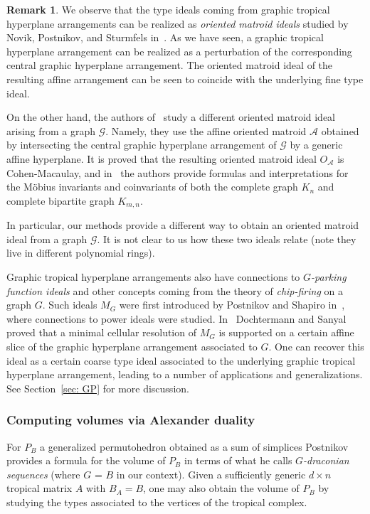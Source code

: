 \documentclass[11pt]{article}
\theoremstyle{definition}
\newtheorem{remark}[theo]{Remark}
\numberwithin{equation}{section}
\newcommand{\cG}{\mathcal{G}}
\begin{document}
\begin{remark}
We observe that the type ideals coming from graphic tropical hyperplane arrangements can be realized as \emph{oriented matroid ideals} studied by Novik, Postnikov, and Sturmfels in~\cite{NPS}.
As we have seen, a graphic tropical hyperplane arrangement can be realized as a perturbation of the corresponding central graphic hyperplane arrangement.  The oriented matroid ideal of the resulting affine arrangement can be seen to coincide with the underlying fine type ideal. 

On the other hand, the authors of~\cite{NPS} study a different oriented matroid ideal arising from a graph $\cG$.  Namely, they use the affine oriented matroid ${\mathcal A}$ obtained by intersecting the central graphic hyperplane arrangement of $\cG$ by a generic affine hyperplane.  It is proved that the resulting oriented matroid ideal $O_{\mathcal A}$ is  Cohen-Macaulay, and in~\cite{NPS} the authors provide formulas and interpretations for the M\"obius invariants and coinvariants of both the complete graph $K_n$ and complete bipartite graph $K_{m,n}$.  

In particular, our methods provide a different way to obtain an oriented matroid ideal from a graph $\cG$.  It is not clear to us how these two ideals relate (note they live in different polynomial rings).
\end{remark}

Graphic tropical hyperplane arrangements also have connections to \emph{$G$-parking function ideals} and other concepts coming from the theory of \emph{chip-firing} on a graph $G$.  Such ideals $M_G$ were first introduced by Postnikov and Shapiro in~\cite{postnikovshapiro}, where connections to power ideals were studied. In~\cite{DocSan} Dochtermann and Sanyal proved that a minimal cellular resolution of $M_G$ is supported on a certain affine slice of the graphic hyperplane arrangement associated to $G$.  One can recover this ideal as a certain coarse type ideal associated to the underlying graphic tropical hyperplane arrangement, leading to a number of applications and generalizations.  See Section~\ref{sec: GP} for more discussion.

\subsubsection{Computing volumes via Alexander duality}
For $P_B$ a generalized permutohedron obtained as a sum of simplices Postnikov~\cite[Theorem 9.3]{postnikov2009permutohedra} provides a formula for the volume of $P_B$ in terms of what he calls \emph{$G$-draconian sequences} (where $G$ = $B$ in our context). Given a sufficiently generic $d\times n$ tropical matrix $A$ with $B_A = B$, one may also obtain the volume of $P_B$ by studying the types associated to the vertices of the tropical complex.
\end{document}
